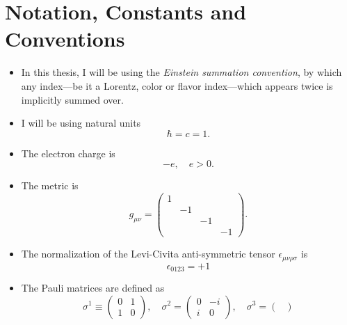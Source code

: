 	\chapter*{Notation, Constants and Conventions} \label{chap:notation_and_conventions}
    \begin{itemize}
        \item In this thesis, I will be using the \textit{Einstein summation convention}, by which any index---be it a Lorentz, color or flavor index---which appears twice is implicitly summed over.
        \item I will be using natural units
        \begin{equation}
            \hbar = c = 1.
        \end{equation}
        \item The electron charge is
        \begin{equation}
            -e, \quad e > 0.
        \end{equation}
        \item The metric is
        \begin{equation}
            g_{\mu \nu} = \begin{pmatrix}
                1 & & & \\
                  & -1 & & \\
                  & & -1 & \\
                  & & & -1
            \end{pmatrix}.
        \end{equation}
        \item The normalization of the Levi-Civita anti-symmetric tensor $\epsilon_{\mu \nu \rho \sigma}$ is
        \begin{equation}
            \epsilon_{0123} = +1
        \end{equation}
        \item The Pauli matrices are defined as
        \begin{equation}
            \sigma^1 \equiv \begin{pmatrix}
                0 & 1 \\
                1 & 0
            \end{pmatrix}, \quad \sigma^2 = \begin{pmatrix}
                0 & - i \\
                i & 0
            \end{pmatrix}, \quad \sigma^3 = \begin{pmatrix}

\end{pmatrix}
\end{equation}
\end{itemize}
